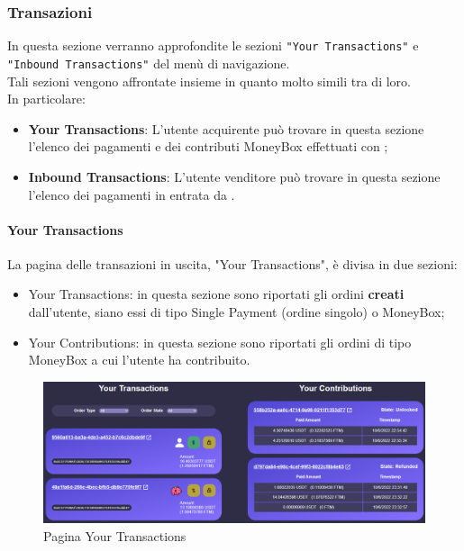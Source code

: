         \subsubsection{Transazioni}
        In questa sezione verranno approfondite le sezioni \texttt{"Your Transactions"} e \texttt{"Inbound Transactions"} del menù di navigazione.\\
        Tali sezioni vengono affrontate insieme in quanto molto simili tra di loro.\\
        In particolare:
        \begin{itemize}
            \item \textbf{Your Transactions}: L'utente acquirente può trovare in questa sezione l'elenco dei pagamenti e dei contributi MoneyBox effettuati con \projectName{};
            \item \textbf{Inbound Transactions}: L'utente venditore può trovare in questa sezione l'elenco dei pagamenti in entrata da \projectName{}.
        \end{itemize}
        \paragraph{Your Transactions}
        La pagina delle transazioni in uscita, "Your Transactions", è divisa in due sezioni:
        \begin{itemize}
            \item Your Transactions: in questa sezione sono riportati gli ordini \textbf{creati} dall'utente, siano essi di tipo Single Payment (ordine singolo) o MoneyBox;
            \item Your Contributions: in questa sezione sono riportati gli ordini di tipo MoneyBox a cui l'utente ha contribuito.
        \end{itemize}
        \begin{figure}[H]
        \centering
        \includegraphics[scale=0.4]{immagini/Transaction/YourTransaction.png}
        \caption{Pagina Your Transactions}
        \end{figure}
